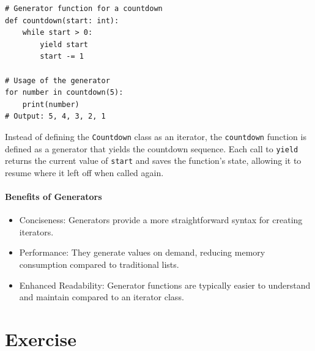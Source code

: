 \documentclass[oneside,11pt,dvipsnames]{book}
\newcommand{\code}[1]{\texttt{#1}}
\begin{document}
\begin{lstlisting}
# Generator function for a countdown
def countdown(start: int):
    while start > 0:
        yield start
        start -= 1

# Usage of the generator
for number in countdown(5):
    print(number)
# Output: 5, 4, 3, 2, 1
\end{lstlisting}

Instead of defining the \code{Countdown} class as an iterator, the \code{countdown} function is defined as a generator that yields the countdown sequence.
Each call to \code{yield} returns the current value of \code{start} and saves the function's state, allowing it to resume where it left off when called again.

\paragraph{Benefits of Generators}
\begin{itemize}
    \item Conciseness: Generators provide a more straightforward syntax for creating iterators.
	\item Performance: They generate values on demand, reducing memory consumption compared to traditional lists.
	\item Enhanced Readability: Generator functions are typically easier to understand and maintain compared to an iterator class.    
\end{itemize}   







\section{Exercise}
\end{document}
